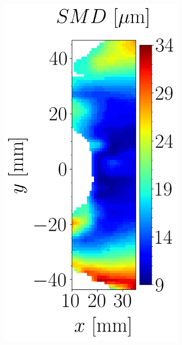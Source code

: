 \begin{figure}[h!]
\flushleft
\begin{subfigure}[b]{0.3\textwidth}
	\centering
   \includegraphics[scale=0.4]{./part3_applications/figures_ch9_lagrangian/expe_maps/SMD_map.png}
\end{subfigure}

\end{figure}
